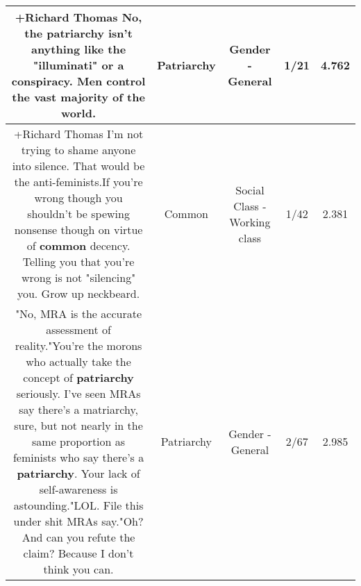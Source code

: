 \documentclass[11pt]{article}
\newlength\mylength
\begin{document}
\begin{center}
\begin{longtable}{|C{.65\mylength}|C{.30\mylength}|C{.12\mylength}|C{.12\mylength}|C{.12\mylength}|}
  \small +Richard Thomas No, the \textbf{patriarchy} isn't anything like the "illuminati" or a conspiracy. Men control the vast majority of the world.\normalsize   & Patriarchy & Gender - General & 1/21 & 4.762 \\  \hline
  \small +Richard Thomas I'm not trying to shame anyone into silence. That would be the anti-feminists.If you're wrong though you shouldn't be spewing nonsense though on virtue of \textbf{common} decency. Telling you that you're wrong is not "silencing" you. Grow up neckbeard.\normalsize   & Common & Social Class - Working class & 1/42 & 2.381 \\  \hline
  \small "No, MRA is the accurate assessment of reality."You're the morons who actually take the concept of \textbf{patriarchy} seriously. I've seen MRAs say there's a matriarchy, sure, but not nearly in the same proportion as feminists who say there's a \textbf{patriarchy}. Your lack of self-awareness is astounding."LOL. File this under shit MRAs say."Oh? And can you refute the claim? Because I don't think you can.\normalsize   & Patriarchy & Gender - General & 2/67 & 2.985 \\  \hline

\end{longtable}
\end{center}
\end{document}
